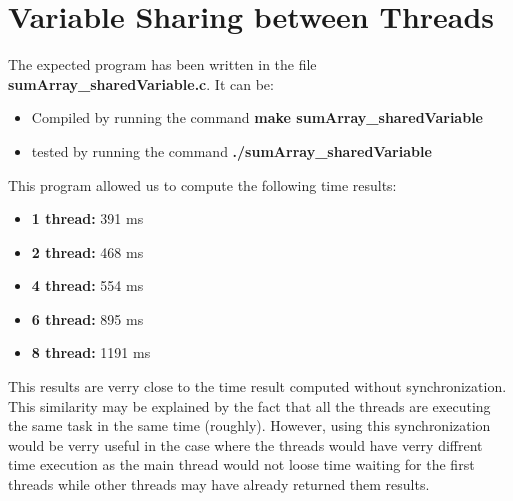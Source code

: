 \documentclass[a4paper,10pt]{article}
\begin{document}
\section{Variable Sharing between Threads}
    The expected program has been written in the file \textbf{sumArray\_sharedVariable.c}.  It can be:
    \begin{itemize}
     \item Compiled by running the command \textbf{make sumArray\_sharedVariable}
     \item tested by running the command \textbf{./sumArray\_sharedVariable}
    \end{itemize}
    This program allowed us to compute the following time results:
    \begin{itemize}
     \item \textbf{1 thread:   } 391 ms
     \item \textbf{2 thread:   } 468 ms
     \item \textbf{4 thread:   } 554 ms
     \item \textbf{6 thread:   } 895 ms
     \item \textbf{8 thread:   } 1191 ms
    \end{itemize}

     This results are verry close to the time result computed without synchronization.  This similarity may be explained by the fact that all the threads are executing the same task in the same time (roughly).\newline
     However, using this synchronization would be verry useful in the case where the threads would have verry diffrent time execution as the main thread would not loose time waiting for the first threads while other threads may have already returned them results.
\end{document}

